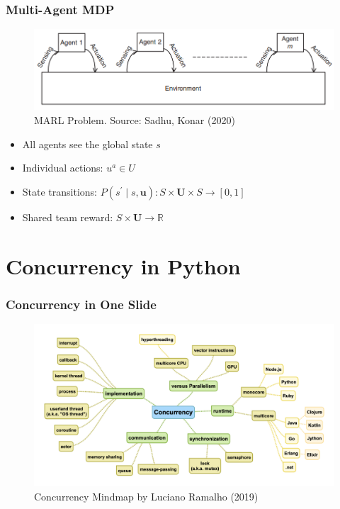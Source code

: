 \documentclass{beamer}
\begin{document}
    \begin{frame}
        \frametitle{Multi-Agent MDP}

        \begin{figure}
            \includegraphics[scale=0.65]{1a_marl}
            \caption{MARL Problem. Source: Sadhu, Konar (2020)}
        \end{figure}

        \begin{itemize}
            \item All agents see the global state $s$
            \item Individual actions: $u^{a} \in U$
            \item State transitions: $P\left(s^{\prime} \mid s, \mathbf{u}\right): S \times \mathbf{U} \times S \rightarrow[0,1]$
            \item Shared team reward: $S \times \mathbf{U} \rightarrow \mathbb{R}$


        \end{itemize}

    \end{frame}







    \section{Concurrency in Python}

\begin{frame}

	\frametitle{Concurrency in One Slide}
	
	\begin{figure}
		\includegraphics[scale=0.35]{2a_mindmap}
		\caption{Concurrency Mindmap by Luciano Ramalho (2019)}
	\end{figure}
	
\end{frame}
\end{document}
